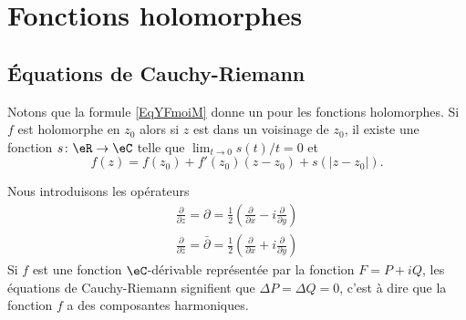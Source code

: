 
\section{Fonctions holomorphes}

\subsection{Équations de Cauchy-Riemann}

Notons que la formule \eqref{EqYFmoiM} donne un  pour les fonctions holomorphes. Si \( f\) est holomorphe en \( z_0\) alors si \( z\) est dans un voisinage de \( z_0\), il existe une fonction \( s\colon \eR\to \eC\) telle que \( \lim_{t\to 0} s(t)/t=0\) et 
\begin{equation}    \label{EqptwBFG}
    f(z)=f(z_0)+f'(z_0)(z-z_0)+s(| z-z_0 |).
\end{equation}

Nous introduisons les opérateurs
\begin{subequations}
    \begin{align}
        \frac{ \partial  }{ \partial z }=\partial=\frac{ 1 }{2}\left( \frac{ \partial  }{ \partial x }-i\frac{ \partial  }{ \partial y } \right)\\
        \frac{ \partial  }{ \partial \bar z }=\bar\partial=\frac{ 1 }{2}\left( \frac{ \partial  }{ \partial x }+i\frac{ \partial  }{ \partial y } \right)
    \end{align}
\end{subequations}
Si \( f\) est une fonction $\eC$-dérivable représentée par la fonction \( F=P+iQ\), les équations de Cauchy-Riemann signifient que \( \Delta P=\Delta Q=0\), c'est à dire que la fonction \( f\) a des composantes harmoniques.

